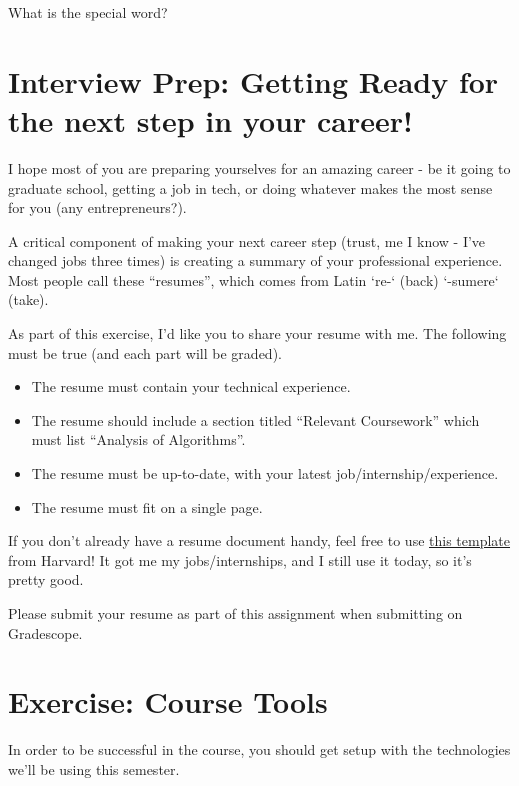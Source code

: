 \documentclass [12pt]{article}
\begin{document}
What is the special word?


\pagebreak
\section{Interview Prep: Getting Ready for the next step in your career!}
 I hope most of you are preparing yourselves for an amazing career - be it going to graduate school, getting a job in tech, or doing whatever makes the most sense for you (any entrepreneurs?).

A critical component of making your next career step (trust, me I know - I've changed jobs three times) is creating a summary of your professional experience. Most people call these ``resumes'', which comes from Latin `re-` (back) `-sumere` (take).

As part of this exercise, I'd like you to share your resume with me. The following must be true (and each part will be graded).

\begin{itemize}
    \item {} The resume must contain your technical experience.
    \item {} The resume should include a section titled ``Relevant Coursework'' which must list ``Analysis of Algorithms''. 
    \item {} The resume must be up-to-date, with your latest job/internship/experience.
    \item {} The resume must fit on a single page. 
\end{itemize}

If you don't already have a resume document handy, feel free to use \href{http://hwpi.harvard.edu/files/ocs/files/template_bullet.doc}{this template} from Harvard! It got me my jobs/internships, and I still use it today, so it's pretty good.

Please submit your resume as part of this assignment when submitting on Gradescope.


\section{Exercise: Course Tools}
 In order to be successful in the course, you should get setup with the technologies we'll be using this semester. 
\end{document}
